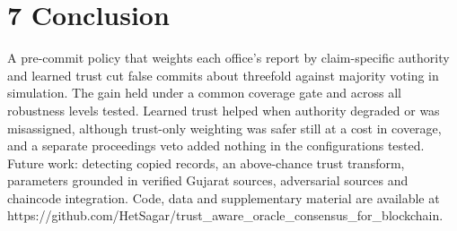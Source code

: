 \documentclass[10pt]{article}
\begin{document}
\section*{7 Conclusion}
A pre-commit policy that weights each office's report by claim-specific authority and learned trust cut false commits about threefold against majority voting in simulation. The gain held under a common coverage gate and across all robustness levels tested. Learned trust helped when authority degraded or was misassigned, although trust-only weighting was safer still at a cost in coverage, and a separate proceedings veto added nothing in the configurations tested. Future work: detecting copied records, an above-chance trust transform, parameters grounded in verified Gujarat sources, adversarial sources and chaincode integration. Code, data and supplementary material are available at https://github.com/HetSagar/trust\_aware\_oracle\_consensus\_for\_blockchain.
\end{document}
